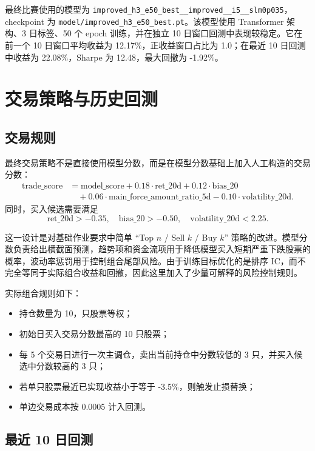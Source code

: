\documentclass[fontset=mac]{ctexart}
\begin{document}
最终比赛使用的模型为 \verb|improved_h3_e50_best__improved__i5__slm0p035|，checkpoint 为 \verb|model/improved_h3_e50_best.pt|。该模型使用 Transformer 架构、3 日标签、50 个 epoch 训练，并在独立 10 日窗口回测中表现较稳定。它在前一个 10 日窗口平均收益为 12.17\%，正收益窗口占比为 1.0；在最近 10 日回测中收益为 22.08\%，Sharpe 为 12.48，最大回撤为 -1.92\%。

\section{交易策略与历史回测}

\subsection{交易规则}

最终交易策略不是直接使用模型分数，而是在模型分数基础上加入人工构造的交易分数：
\[
\begin{aligned}
\mathrm{trade\_score}
&= \mathrm{model\_score}
 + 0.18 \cdot \mathrm{ret\_20d}
 + 0.12 \cdot \mathrm{bias\_20} \\
&\quad + 0.06 \cdot \mathrm{main\_force\_amount\_ratio\_5d}
 - 0.10 \cdot \mathrm{volatility\_20d}.
\end{aligned}
\]
同时，买入候选需要满足
\[
    \mathrm{ret\_20d}>-0.35,\quad
    \mathrm{bias\_20}>-0.50,\quad
    \mathrm{volatility\_20d}<2.25 .
\]

这一设计是对基础作业要求中简单 ``Top $n$ / Sell $k$ / Buy $k$'' 策略的改进。模型分数负责给出横截面预测，趋势项和资金流项用于降低模型买入短期严重下跌股票的概率，波动率惩罚用于控制组合尾部风险。由于训练目标优化的是排序 IC，而不完全等同于实际组合收益和回撤，因此这里加入了少量可解释的风险控制规则。

实际组合规则如下：
\begin{itemize}[noitemsep]
    \item 持仓数量为 10，只股票等权；
    \item 初始日买入交易分数最高的 10 只股票；
    \item 每 5 个交易日进行一次主调仓，卖出当前持仓中分数较低的 3 只，并买入候选中分数较高的 3 只；
    \item 若单只股票最近已实现收益小于等于 -3.5\%，则触发止损替换；
    \item 单边交易成本按 0.0005 计入回测。
\end{itemize}

\subsection{最近 10 日回测}
\end{document}
